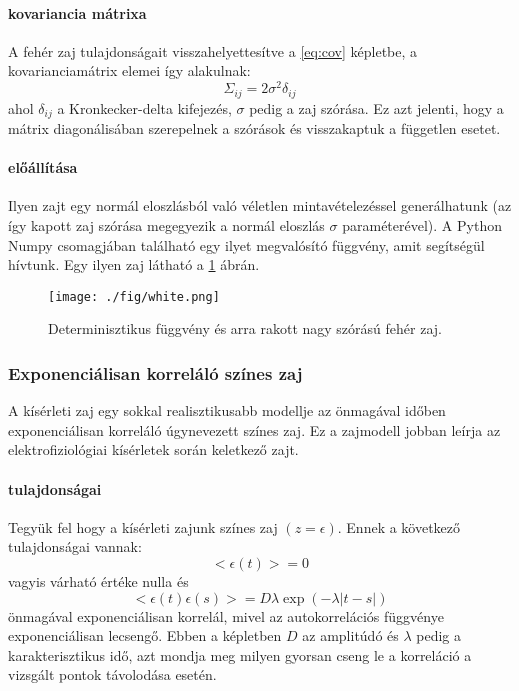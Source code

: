 \paragraph{kovariancia mátrixa}
A fehér zaj tulajdonságait visszahelyettesítve a \ref{eq:cov} képletbe, a kovarianciamátrix elemei így alakulnak:
\begin{equation}
	\Sigma_{ij} = 2\sigma^2 \delta_{ij}
\end{equation}
ahol $\delta_{ij}$ a Kronkecker-delta kifejezés, $\sigma$ pedig a zaj szórása. Ez azt jelenti, hogy a mátrix diagonálisában szerepelnek a szórások és visszakaptuk a független esetet.

\paragraph{előállítása}
Ilyen zajt egy normál eloszlásból való véletlen mintavételezéssel generálhatunk (az így kapott zaj szórása megegyezik a normál eloszlás $\sigma$ paraméterével). A Python Numpy csomagjában található egy ilyet megvalósító függvény, amit segítségül hívtunk. Egy ilyen zaj látható a \ref{fig:white} ábrán.

\begin{figure}[!htb]
	\centering
	\texttt{[image: ./fig/white.png]}
	\caption[Fehér zaj]{Determinisztikus függvény és arra rakott nagy szórású fehér zaj.}
	\label{fig:white}
\end{figure}


\FloatBarrier
\subsubsection{Exponenciálisan korreláló színes zaj}
A kísérleti zaj egy sokkal realisztikusabb modellje az önmagával időben exponenciálisan korreláló úgynevezett színes zaj. Ez a zajmodell jobban leírja az elektrofiziológiai kísérletek során keletkező zajt. 

\paragraph{tulajdonságai}
Tegyük fel hogy a kísérleti zajunk színes zaj $(z = \epsilon)$. Ennek a következő tulajdonságai vannak:
\begin{equation}
<\epsilon(t)> = 0
\end{equation}
vagyis várható értéke nulla és
\begin{equation}
<\epsilon(t)\epsilon(s)> = D\lambda \exp(-\lambda|t-s|)
\end{equation}
önmagával exponenciálisan korrelál, mivel az autokorrelációs függvénye exponenciálisan lecsengő. Ebben a képletben $D$ az amplitúdó és $\lambda$ pedig a karakterisztikus idő, azt mondja meg milyen gyorsan cseng le a korreláció a vizsgált pontok távolodása esetén. 

